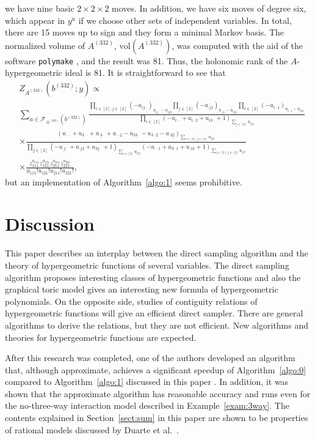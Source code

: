 \documentclass[a4paper,12pt]{article}
\theoremstyle{plain}
\theoremstyle{remark}
\begin{document}
we have nine basic $2\times2\times2$ moves. In addition, we have
six moves of degree six, which appear in $y^u$ if we choose other
sets of independent variables. In total, there are 15 moves up to
sign and they form a minimal Markov basis. The normalized volume of
$A^{(332)}$, $\text{vol}(A^{(332)})$, was computed with the aid of the software {\tt polymake}
\cite{GJ00}, and the result was 81. Thus, the holonomic rank of
the $A$-hypergeometric ideal is 81. It is straightforward to see that
\begin{align*}
  &Z_{A^{(332)}}(b^{(332)};y)\propto\\&
  \sum_{u\in\mathcal{F}_{A^{(332)}}(b^{(322)})}
  \frac{
  \prod_{i\in[2],j\in[2]}
  (-u_{ij\cdot})_{u_{ij\cdot}-u_{ij2}}    
  \prod_{j\in[2]}(-u_{\cdot j1})_{u_{\cdot j1}-u_{3j1}}    
  \prod_{i\in[2]}(-u_{i\cdot1})_{u_{i\cdot 1}-u_{i31}}}
  {\prod_{i\in[2]}(-u_{i\cdot\cdot}+u_{i\cdot2}+u_{i3\cdot}+1)_{\sum_{j\in[2]}u_{ij1}}}\\
  &\times
  \frac{(u_{\cdot\cdot\cdot}+u_{3\cdot\cdot}+u_{\cdot3\cdot}+u_{\cdot\cdot2}-u_{33\cdot}-u_{3\cdot2}-u_{\cdot32})_{\sum_{i\in[2],j\in[2]}u_{ij1}}}
  {\prod_{j\in[2]}(-u_{\cdot j\cdot}+u_{\cdot j2}+u_{3j\cdot}+1)_{\sum_{i\in[2]}u_{ij1}}
  (-u_{\cdot\cdot1}+u_{3\cdot1}+u_{\cdot31}+1)_{\sum_{i\in[2],j\in[2]}u_{ij1}}}\\
  &\times\frac{z_{111}^{u_{111}}z_{121}^{u_{121}}z_{211}^{u_{211}}z_{221}^{u_{221}}}{u_{111}!u_{121}!u_{211}!u_{221}!},
\end{align*}
but an implementation of Algorithm~\ref{algo:1} seems prohibitive.

\section{Discussion}

This paper describes an interplay between the direct sampling
algorithm and the theory of hypergeometric functions of several
variables. The direct sampling algorithm proposes interesting
classes of hypergeometric functions and also the graphical
toric model gives an interesting new formula of hypergeometric
polynomials. On the opposite side, studies of contiguity relations
of hypergeometric functions will give an efficient direct sampler.
There are general algorithms to derive the relations, but they are
not efficient. New algorithms and theories for hypergeometric
functions are expected.

After this research was completed, one of the authors developed
an algorithm that, although approximate, achieves a significant
speedup of Algorithm~\ref{algo:0} compared to Algorithm~\ref{algo:1}
discussed in this paper \cite{Man25}. In addition, it was shown
that the approximate algorithm has reasonable accuracy and runs
even for the no-three-way interaction model described in
Example~\ref{exam:3way}. The contents explained in Section~\ref{sect:sum}
in this paper are shown to be properties of rational models
discussed by Duarte et al.~\cite{DMS21}.
\end{document}
